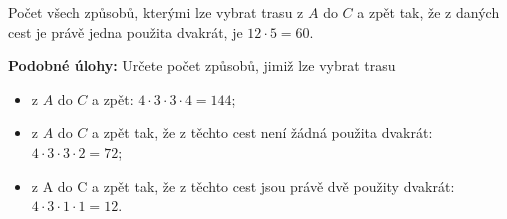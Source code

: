 \begin{mdframed}[style=mdexam]
\begin{example}
    Počet všech způsobů, kterými lze vybrat trasu z \(A\) do \(C\) a zpět tak, že z daných cest je
    právě jedna použita dvakrát, je \(12\cdot5 = 60\).

    \textbf{Podobné úlohy:} Určete počet způsobů, jimiž lze vybrat trasu
    \vspace*{-0.5\baselineskip}
    \begin{itemize}[noitemsep]
      \item z \(A\) do \(C\) a zpět: \(4\cdot3\cdot3\cdot4=144\);
      \item z \(A\) do \(C\) a zpět tak, že z těchto cest není žádná použita dvakrát:
            \(4\cdot3\cdot3\cdot2=72\);
      \item z A do C a zpět tak, že z těchto cest jsou právě dvě použity dvakrát:
            \(4\cdot3\cdot1\cdot1 = 12\).
    \end{itemize}
  \end{example}
\end{mdframed}